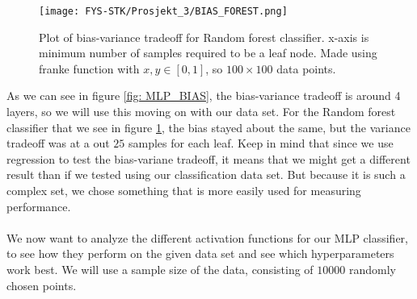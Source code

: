 \documentclass[english,notitlepage,reprint,nofootinbib]{revtex4-1}  %
\begin{document}
\begin{figure}[H]
    \centering
    \texttt{[image: FYS-STK/Prosjekt\_3/BIAS\_FOREST.png]}
    \caption{Plot of bias-variance tradeoff for Random forest classifier. x-axis is minimum number of samples required to be a leaf node. Made using franke function with $x,y \in [0,1]$, so $100 \times 100$ data points.}
    \label{fig: FOREST_BIAS}
\end{figure}

As we can see in figure \ref{fig: MLP_BIAS}, the bias-variance tradeoff is around 4 layers, so we will use this moving on with our data set. For the Random forest classifier that we see in figure \ref{fig: FOREST_BIAS}, the bias stayed about the same, but the variance tradeoff was at a out $25$ samples for each leaf. Keep in mind that since we use regression to test the bias-variane tradeoff, it means that we might get a different result than if we tested using our classification data set. But because it is such a complex set, we chose something that is more easily used for measuring performance. 
\\
\\
We now want to analyze the different activation functions for our MLP classifier, to see how they perform on the given data set and see which hyperparameters work best. We will use a sample size of the data, consisting of $10 000$ randomly chosen points. %
\end{document}
